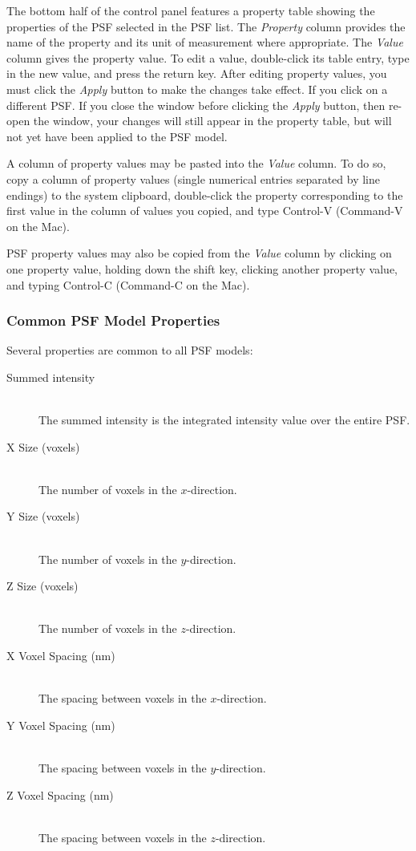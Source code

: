 \documentclass[11pt,titlepage,twoside]{article}
\begin{document}
The bottom half of the control panel features a property table showing the properties of the PSF selected in the PSF list. The \emph{Property} column provides the name of the property and its unit of measurement where appropriate. The \emph{Value} column gives the property value. To edit a value, double-click its table entry, type in the new value, and press the return key. After editing property values, you must click the \emph{Apply} button to make the changes take effect. If you click on a different PSF. If you close the window before clicking the \emph{Apply} button, then re-open the window, your changes will still appear in the property table, but will not yet have been applied to the PSF model.

A column of property values may be pasted into the \emph{Value} column. To do so, copy a column of property values (single numerical entries separated by line endings) to the system clipboard, double-click the property corresponding to the first value in the column of values you copied, and type Control-V (Command-V on the Mac).

PSF property values may also be copied  from the \emph{Value} column by clicking on one property value, holding down the shift key, clicking another property value, and typing Control-C (Command-C on the Mac).

\subsubsection{Common PSF Model Properties}

Several properties are common to all PSF models:

\begin{description}

\item[Summed intensity] \hfill \\
The summed intensity is the integrated intensity value over the entire PSF.

\item[X Size (voxels)] \hfill \\
The number of voxels in the $x$-direction.

\item[Y Size (voxels)] \hfill \\
The number of voxels in the $y$-direction.

\item[Z Size (voxels)] \hfill \\
The number of voxels in the $z$-direction.

\item[X Voxel Spacing (nm)] \hfill \\
The spacing between voxels in the $x$-direction.

\item[Y Voxel Spacing (nm)] \hfill \\
The spacing between voxels in the $y$-direction.

\item[Z Voxel Spacing (nm)] \hfill \\
The spacing between voxels in the $z$-direction.

\end{description}
\end{document}
